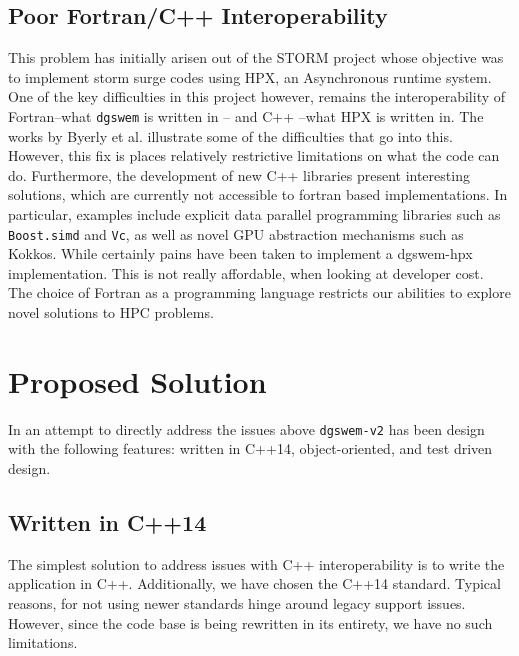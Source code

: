 \subsection{Poor Fortran/C++ Interoperability}
This problem has initially arisen out of the STORM project whose objective was to implement storm surge codes using HPX, an Asynchronous runtime system. One of the key difficulties in this project however, remains the interoperability of Fortran--what \texttt{dgswem} is written in -- and C++ --what HPX is written in. The works by Byerly et al. \cite{byerly15} illustrate some of the difficulties that go into this. However, this fix is places relatively restrictive limitations on what the code can do. Furthermore, the development of new C++ libraries present interesting solutions, which are currently not accessible to fortran based implementations. In particular, examples include explicit data parallel programming libraries such as \texttt{Boost.simd} and \texttt{Vc}, as well as novel GPU abstraction mechanisms such as Kokkos. While certainly pains have been taken to implement a dgswem-hpx implementation. This is not really affordable, when looking at developer cost. The choice of Fortran as a programming language restricts our abilities to explore novel solutions to HPC problems.

\section{Proposed Solution}
In an attempt to directly address the issues above \texttt{dgswem-v2} has been design with the following features: written in C++14, object-oriented, and test driven design.

\subsection{Written in C++14}
The simplest solution to address issues with C++ interoperability is to write the application in C++. Additionally, we have chosen the C++14 standard. Typical reasons, for not using newer standards hinge around legacy support issues. However, since the code base is being rewritten in its entirety, we have no such limitations.

